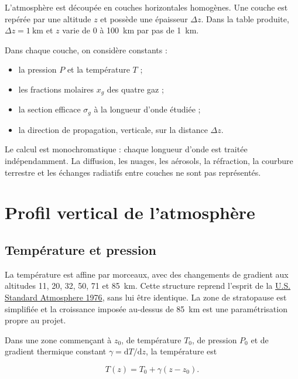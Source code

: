 \documentclass[11pt,a4paper]{article}
\begin{document}
L'atmosphère est découpée en couches horizontales homogènes. Une couche est
repérée par une altitude $z$ et possède une épaisseur $\Delta z$. Dans la
table produite, $\Delta z=\SI{1}{\kilo\metre}$ et $z$ varie de 0 à
\SI{100}{\kilo\metre} par pas de \SI{1}{\kilo\metre}.

Dans chaque couche, on considère constants :

\begin{itemize}[itemsep=2pt]
  \item la pression $P$ et la température $T$ ;
  \item les fractions molaires $x_g$ des quatre gaz ;
  \item la section efficace $\sigma_g$ à la longueur d'onde étudiée ;
  \item la direction de propagation, verticale, sur la distance $\Delta z$.
\end{itemize}

Le calcul est monochromatique : chaque longueur d'onde est traitée
indépendamment. La diffusion, les nuages, les aérosols, la réfraction, la
courbure terrestre et les échanges radiatifs entre couches ne sont pas
représentés.

\section{Profil vertical de l'atmosphère}

\subsection{Température et pression}

La température est affine par morceaux, avec des changements de gradient aux
altitudes 11, 20, 32, 50, 71 et \SI{85}{\kilo\metre}. Cette structure reprend
l'esprit de la
\href{https://www.ngdc.noaa.gov/stp/space-weather/online-publications/miscellaneous/us-standard-atmosphere-1976/us-standard-atmosphere_st76-1562_noaa.pdf}{U.S.
Standard Atmosphere 1976}, sans lui être identique. La zone de stratopause est
simplifiée et la croissance imposée au-dessus de \SI{85}{\kilo\metre} est une
paramétrisation propre au projet.

Dans une zone commençant à $z_0$, de température $T_0$, de pression $P_0$ et
de gradient thermique constant $\gamma=\mathrm dT/\mathrm dz$, la température
est

\begin{equation}
  T(z)=T_0+\gamma(z-z_0).
\end{equation}
\end{document}
